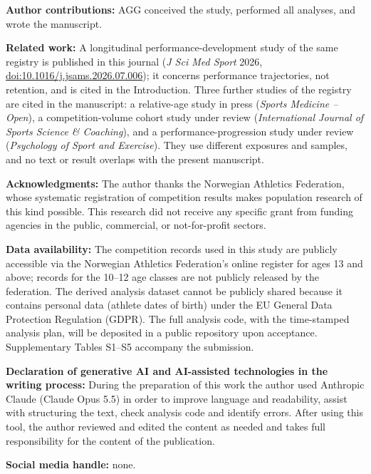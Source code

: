 \documentclass[12pt,a4paper]{article}
\begin{document}
\medskip
\noindent\textbf{Author contributions:} AGG conceived the study, performed all analyses, and wrote the manuscript.

\medskip
\noindent\textbf{Related work:} A longitudinal performance-development study of the same registry is published in this journal (\emph{J Sci Med Sport} 2026, \href{https://doi.org/10.1016/j.jsams.2026.07.006}{doi:10.1016/j.jsams.2026.07.006}); it concerns performance trajectories, not retention, and is cited in the Introduction. Three further studies of the registry are cited in the manuscript: a relative-age study in press (\emph{Sports Medicine -- Open}), a competition-volume cohort study under review (\emph{International Journal of Sports Science \& Coaching}), and a performance-progression study under review (\emph{Psychology of Sport and Exercise}). They use different exposures and samples, and no text or result overlaps with the present manuscript.

\medskip
\noindent\textbf{Acknowledgments:} The author thanks the Norwegian Athletics Federation, whose systematic registration of competition results makes population research of this kind possible. This research did not receive any specific grant from funding agencies in the public, commercial, or not-for-profit sectors.

\medskip
\noindent\textbf{Data availability:} The competition records used in this study are publicly accessible via the Norwegian Athletics Federation's online register for ages 13 and above; records for the 10--12 age classes are not publicly released by the federation. The derived analysis dataset cannot be publicly shared because it contains personal data (athlete dates of birth) under the EU General Data Protection Regulation (GDPR). The full analysis code, with the time-stamped analysis plan, will be deposited in a public repository upon acceptance. Supplementary Tables S1--S5 accompany the submission.

\medskip
\noindent\textbf{Declaration of generative AI and AI-assisted technologies in the writing process:} During the preparation of this work the author used Anthropic Claude (Claude Opus 5.5) in order to improve language and readability, assist with structuring the text, check analysis code and identify errors. After using this tool, the author reviewed and edited the content as needed and takes full responsibility for the content of the publication.

\medskip
\noindent\textbf{Social media handle:} none.
\end{document}
